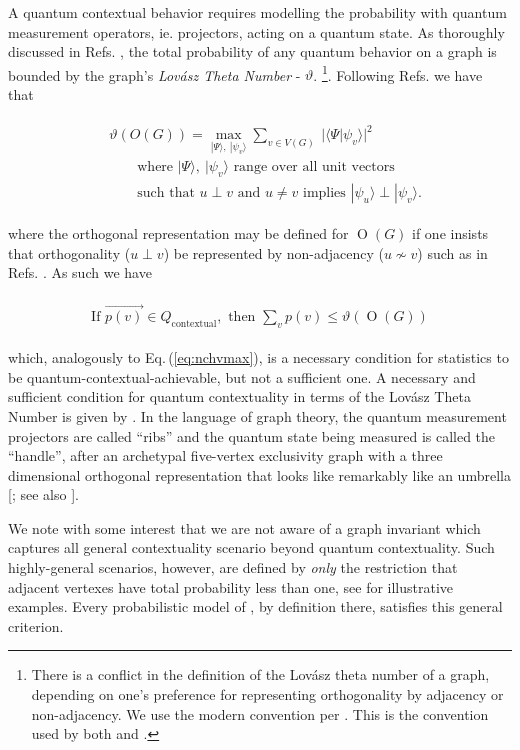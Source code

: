 \documentclass[
  12pt          %
  ,letterpaper  %
  ,center       %
  ,noupper      %
  ,english,fleqn]{uconnthesis}
\newcommand{\LeftEqns}[1]{\begin{fleqn}[\leftmargini minus \leftmargini]\begin{align}#1\end{align}\end{fleqn}}
\newcommand{\LeftEqn}[1]{\LeftEqns{\begin{split}#1\end{split}}}
\newcommand{\ceq}[1]{Eq.\,(\ref{#1})}
\begin{document}
A quantum contextual behavior requires modelling the probability with quantum measurement operators, ie. projectors, acting on a quantum state. As thoroughly discussed in Refs. \cite{CSWOld,EPOriginal,FritzCombinatorialLong,CSWNew,CabelloMultigraph}, the total probability of any quantum behavior on a graph is bounded by the graph's {\em Lov{\'a}sz Theta Number} - $\vartheta$. \footnote{There is a conflict in the definition of the Lov{\'a}sz theta number of a graph, depending on one's preference for representing orthogonality by adjacency or non-adjacency. We use the modern convention per \citet{knuth1993sandwich}. This is the convention used by both \citet{CSWNew} and \citet{FritzCombinatorialLong}.}. Following Refs. \cite{CSWOld,CSWNew} we have that
\LeftEqn{
&\vartheta(O(G)) = \max_{|\Psi\rangle,\:|\psi_v\rangle} \sum_{v\in V(G)} \:|\langle\Psi|\psi_v\rangle|^2
\\&\qquad\text{where ${|\Psi\rangle,\:|\psi_v\rangle}$ range over all unit vectors}
\\&\qquad\text{such that $u\perp v$ and $u\neq v$ implies $|\psi_u\rangle\perp|\psi_v\rangle$}.
}
where the orthogonal representation may be defined for $\operatorname{O}{\left(G\right)}$ if one insists that orthogonality ($u\perp v$) be represented by non-adjacency ($u\not\sim v$) such as in Refs.  \cite{knuth1993sandwich,FritzCombinatorialLong}. As such we have
\LeftEqn{\label{eq:qcontextual}
\text{If }\overrightarrow{p(v)}\in Q_{\mbox{contextual}},\text{ then }\sum_v{p(v)}\leq {\vartheta{\left(\operatorname{O}{\left(G\right)}\right)}}
}
which, analogously to \ceq{eq:nchvmax}, is a necessary condition for statistics to be quantum-contextual-achievable, but not a sufficient one. A necessary and sufficient condition for quantum contextuality in terms of the Lov{\'a}sz Theta Number is given by \citet[Prop. 6.3.2]{FritzCombinatorialLong}. In the language of graph theory, the quantum measurement projectors are called ``ribs'' and the quantum state being measured is called the ``handle'', after an archetypal five-vertex exclusivity graph with a three dimensional orthogonal  representation that looks like remarkably like an umbrella [\citealp[Theorem 2]{LovaszHandle}; see also \citealp{UPBOriginal,CabelloMultigraph}].


We note with some interest that we are not aware of a graph invariant which captures all general contextuality scenario beyond quantum contextuality. Such highly-general scenarios, however, are defined by {\em only} the restriction that adjacent vertexes have total probability less than one, see \citet{SpekkensSeer} for illustrative examples. Every probabilistic model of \citet{FritzCombinatorialLong}, by definition there, satisfies this general criterion.
\end{document}
